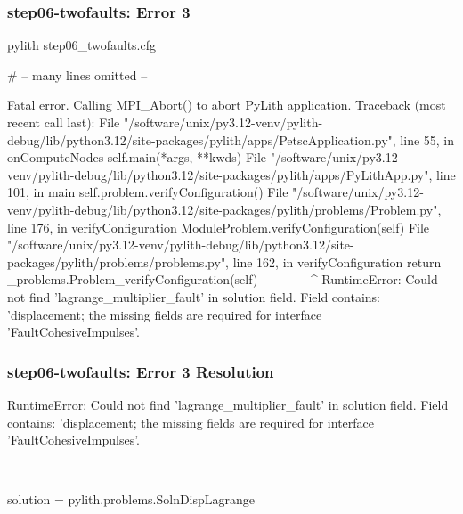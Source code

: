 \documentclass[aspectratio=169]{beamer}
\begin{document}
\begin{frame}[fragile]
  \frametitle{{\ttfamily step06-twofaults}: Error 3}

\begin{bashcode}
pylith step06_twofaults.cfg

# -- many lines omitted --

Fatal error. Calling MPI_Abort() to abort PyLith application.
Traceback (most recent call last):
  File "/software/unix/py3.12-venv/pylith-debug/lib/python3.12/site-packages/pylith/apps/PetscApplication.py", line 55, in onComputeNodes
    self.main(*args, **kwds)
  File "/software/unix/py3.12-venv/pylith-debug/lib/python3.12/site-packages/pylith/apps/PyLithApp.py", line 101, in main
    self.problem.verifyConfiguration()
  File "/software/unix/py3.12-venv/pylith-debug/lib/python3.12/site-packages/pylith/problems/Problem.py", line 176, in verifyConfiguration
    ModuleProblem.verifyConfiguration(self)
  File "/software/unix/py3.12-venv/pylith-debug/lib/python3.12/site-packages/pylith/problems/problems.py", line 162, in verifyConfiguration
    return _problems.Problem_verifyConfiguration(self)
           ^^^^^^^^^^^^^^^^^^^^^^^^^^^^^^^^^^^^^^^^^^^
RuntimeError: Could not find 'lagrange_multiplier_fault' in solution field. Field contains: 'displacement; the missing fields are required for interface 'FaultCohesiveImpulses'.
\end{bashcode}

\end{frame}


\begin{frame}[t,fragile]
  \frametitle{{\ttfamily step06-twofaults}: Error 3 Resolution}

  \tserror
  \begin{bashcode}
RuntimeError: Could not find 'lagrange_multiplier_fault' in solution field. Field contains: 'displacement; the missing fields are required for interface 'FaultCohesiveImpulses'.
  \end{bashcode}

  \pause\\[1pt]

  \begin{cfgcode}
    solution = pylith.problems.SolnDispLagrange
  \end{cfgcode}

\end{frame}
\end{document}
